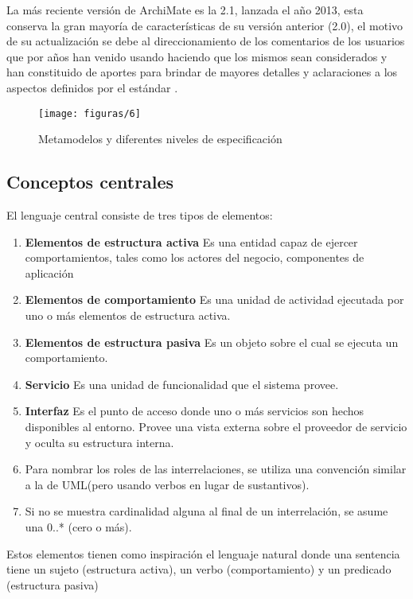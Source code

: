   La más reciente versión de ArchiMate es la 2.1, lanzada el año 2013, esta conserva la gran mayoría de características de su versión anterior (2.0), el motivo de su actualización se debe al direccionamiento de los comentarios de los usuarios que por años han venido usando haciendo que los mismos sean considerados y han constituido de aportes para brindar de mayores detalles y aclaraciones a los aspectos definidos por el estándar \cite{ref9}.
  
 \begin{figure}[H]
   	\centering
   	\texttt{[image: figuras/6]}
   	\captionsetup{width=.95\textwidth}
   	\caption{Metamodelos y diferentes niveles de especificación \cite{ref9}}
   	\label{figura6}
 \end{figure}
  
  \subsection{Conceptos centrales}
  El lenguaje central consiste de tres tipos de elementos:
  \begin{enumerate}
  	\item \textbf{Elementos de estructura activa} Es una entidad capaz de ejercer comportamientos, tales como los actores del negocio, componentes de aplicación
  	\item \textbf{Elementos de comportamiento} Es una unidad de actividad ejecutada por uno o más elementos de estructura activa.
  	\item \textbf{Elementos de estructura pasiva} Es un objeto sobre el cual se ejecuta un comportamiento.
  	\item \textbf{Servicio} Es una unidad de funcionalidad que el sistema provee.
  	\item \textbf{Interfaz} Es el punto de acceso donde uno o más servicios son hechos disponibles al entorno. Provee una vista externa sobre el proveedor de servicio y oculta su estructura interna.
  	\item Para nombrar los roles de las interrelaciones, se utiliza una convención similar a la de UML(pero usando verbos en lugar de sustantivos).
  	\item Si no se muestra cardinalidad alguna al final de un interrelación, se asume una 0..* (cero o más).
  \end{enumerate}

  Estos elementos tienen como inspiración el lenguaje natural donde una sentencia tiene un sujeto (estructura activa), un verbo (comportamiento) y un predicado (estructura pasiva)
  
